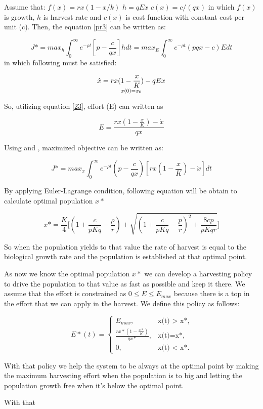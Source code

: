 Assume that:
$f(x)=rx(1-x/k)$
$h=qEx$
$c(x)=c/(qx)$
in which $f(x)$ is growth, $h$ is harvest rate and $c(x)$ is cost function with constant cost per unit (c).
Then, the equation \ref{pr3} can be written as:

\begin{equation}
J* = max_{h}\int_{0}^{\infty} e^{-\rho t}[p-\frac{c}{qx}]h dt= max_{E}\int_{0}^{\infty} e^{-\rho t}(pqx-c)E dt
\end{equation}
\label{22}
in which following must be satisfied:

\begin{equation}
\dot{x}=rx(1-\frac{x}{K})-qEx \atop
x(0) = x_{0}
\end{equation}
\label{23}

So, utilizing equation \ref{23}, effort (E) can written as

\begin{equation}
E=\frac{rx(1-\frac{x}{K})-\dot{x}}{qx}
\end{equation}

Using \label{22} and \label{23}, maximized objective can be written as:

\begin{equation}
J* = max_{x}\int_{0}^{\infty} e^{-\rho t}(p-\frac{c}{qx})[rx(1-\frac{x}{K})-\dot{x}] dt
\end{equation}

By applying Euler-Lagrange condition, following equation will be obtain to calculate optimal population $x*$

\begin{equation}
x*=\frac{K}{4}\Bigg[(1+\frac{c}{pKq}-\frac{\rho}{r})+\sqrt{(1+\frac{c}{pKq}-\frac{p}{r})^2+\frac{8cp}{pKqr}}\Bigg]
\end{equation}

So when the population yields to that value the rate of harvest is equal to the biological growth rate and the population is established at that optimal point.

As now we know the optimal population $x*$ we can develop a harvesting policy to drive the population to that value as fast as possible and keep it there. We assume that the effort is constrained as $0\leq E \leq E_{max}$ because there is a top in the effort that we can apply in the harvest. We define this policy as follows:

\begin{equation}
E*(t) = \begin{cases} E_{max}, & \mbox{x(t) $>$ x*,} \\ \frac{rx*(1-\frac{x*}{K})}{qx*}, & \mbox{x(t)=x*,} \\ 0, & \mbox{x(t) $<$ x*.} \end{cases}
\end{equation}

With that policy we help the system to be always at the optimal point by making the maximum harvesting effort when the population is to big and letting the population growth free when it's below the optimal point.

With that 